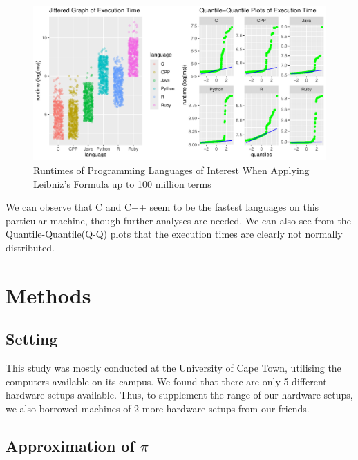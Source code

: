 \documentclass[12pt,halfline,a4paper,]{ouparticle}
\begin{document}
\begin{figure}[H]
\includegraphics[width=1\linewidth]{final_files/figure-latex/figPrior-1} \caption{Runtimes of Programming Languages of Interest When Applying Leibniz's Formula up to 100 million terms}\label{fig:figPrior}
\end{figure}

We can observe that C and C++ seem to be the fastest languages on this
particular machine, though further analyses are needed. We can also see
from the Quantile-Quantile(Q-Q) plots that the execution times are
clearly not normally distributed. \newpage

\section{Methods}\label{methods}

\subsection{Setting}\label{setting}

This study was mostly conducted at the University of Cape Town,
utilising the computers available on its campus. We found that there are
only 5 different hardware setups available. Thus, to supplement the
range of our hardware setups, we also borrowed machines of 2 more
hardware setups from our friends.

\subsection{\texorpdfstring{Approximation of
\(\pi\)}{Approximation of \textbackslash pi}}\label{approximation-of-pi}
\end{document}
